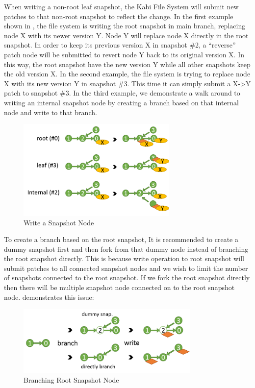     When writing a non-root leaf snapshot, the Kabi File System will submit new patches to that non-root snapshot to reflect the change. In the first example shown in , the file system is writing the root snapshot in main branch, replacing node X with its newer version Y. Node Y will replace node X directly in the root snapshot. In order to keep its previous version X in snapshot \#2, a “reverse” patch node will be submitted to revert node Y back to its original version X. In this way, the root snapshot have the new version Y while all other snapshots keep the old version X.  In the second example, the file system is trying to replace node X with its new version Y in snapshot \#3. This time it can simply submit a X->Y patch to snapshot \#3. In the third example, we demonstrate a walk around to writing an internal snapshot node by creating a branch based on that internal node and write to that branch.

\begin{figure}[hbtp]
\centering
\includegraphics[width=0.7\textwidth]{Chapter-4/figs/fig17.png}
\caption{Write a Snapshot Node}
\label{fig:write_snapshot_node}
\end{figure}

    To create a branch based on the root snapshot, It is recommended to create a dummy snapshot first and then fork from that dummy node instead of branching the root snapshot directly. This is because write operation to root snapshot will submit patches to all connected snapshot nodes and we wish to limit the number of snapshots connected to the root snapshot. If we fork the root snapshot directly then there will be multiple snapshot node connected on to the root snapshot node.  demonstrates this issue:

\begin{figure}[hbtp]
\centering
\includegraphics[width=0.8\textwidth]{Chapter-4/figs/fig16.png}
\caption{Branching Root Snapshot Node}
\label{fig:dummy_node}
\end{figure}

